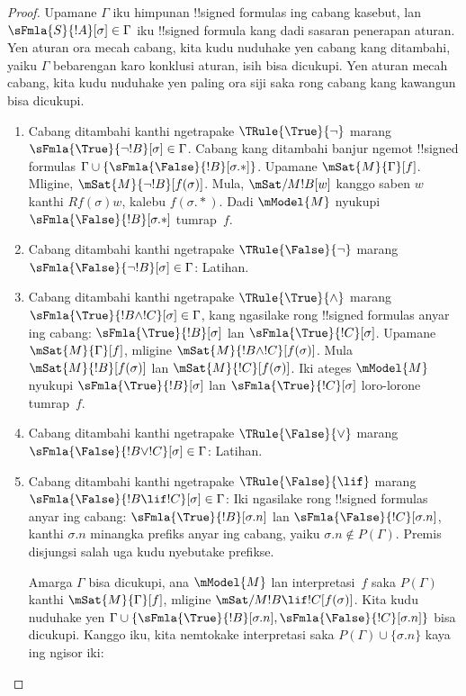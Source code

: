 \documentclass[../../../include/open-logic-section]{subfiles}
\begin{document}
\begin{proof}
Upamane $\Gamma$ iku himpunan !!{signed formula}s ing cabang kasebut,
lan $\sFmla{S}{!A}[\sigma] \in \Gamma$ iku !!{signed formula} kang
dadi sasaran penerapan aturan. Yen aturan ora mecah cabang, kita
kudu nuduhake yen cabang kang ditambahi, yaiku $\Gamma$ bebarengan
karo konklusi aturan, isih bisa dicukupi. Yen aturan mecah cabang,
kita kudu nuduhake yen paling ora siji saka rong cabang kang
kawangun bisa dicukupi.
\begin{enumerate}
\item Cabang ditambahi kanthi ngetrapake $\TRule{\True}{\lnot}$ marang
  $\sFmla{\True}{\lnot !B}[\sigma] \in \Gamma$. Cabang kang ditambahi
  banjur ngemot !!{signed formula}s $\Gamma \cup
  \{\sFmla{\False}{!B}[\sigma.{*}]\}$. Upamane $\mSat{M}{\Gamma}[f]$.
  Mligine, $\mSat{M}{\lnot !B}[f(\sigma)]$. Mula,
  $\mSat/{M}{!B}[w]$ kanggo saben $w$ kanthi $Rf(\sigma)w$, kalebu
  $f(\sigma.{*})$. Dadi $\mModel{M}$ nyukupi
  $\sFmla{\False}{!B}[\sigma.{*}]$ tumrap~$f$.
\item Cabang ditambahi kanthi ngetrapake $\TRule{\False}{\lnot}$ marang
  $\sFmla{\False}{\lnot !B}[\sigma] \in \Gamma$: Latihan.
\item Cabang ditambahi kanthi ngetrapake $\TRule{\True}{\land}$ marang
  $\sFmla{\True}{!B \land !C}[\sigma] \in \Gamma$, kang ngasilake
  rong !!{signed formula}s anyar ing cabang:
  $\sFmla{\True}{!B}[\sigma]$ lan $\sFmla{\True}{!C}[\sigma]$.
  Upamane $\mSat{M}{\Gamma}[f]$, mligine $\mSat{M}{!B \land
    !C}[f(\sigma)]$. Mula $\mSat{M}{!B}[f(\sigma)]$ lan
  $\mSat{M}{!C}[f(\sigma)]$. Iki ateges $\mModel{M}$ nyukupi
  $\sFmla{\True}{!B}[\sigma]$ lan $\sFmla{\True}{!C}[\sigma]$
  loro-lorone tumrap~$f$.
\item Cabang ditambahi kanthi ngetrapake $\TRule{\False}{\lor}$ marang
  $\sFmla{\False}{!B \lor !C}[\sigma] \in \Gamma$: Latihan.
\item Cabang ditambahi kanthi ngetrapake $\TRule{\False}{\lif}$ marang
  $\sFmla{\False}{!B \lif !C}[\sigma] \in \Gamma$: Iki ngasilake rong
  !!{signed formula}s anyar ing cabang: $\sFmla{\True}{!B}[\sigma.n]$ lan
  $\sFmla{\False}{!C}[\sigma.n]$, kanthi $\sigma.n$ minangka prefiks
  anyar ing cabang, yaiku $\sigma.n \notin P(\Gamma)$.
Premis disjungsi salah uga kudu nyebutake prefikse.
  
  Amarga $\Gamma$ bisa dicukupi, ana $\mModel{M}$ lan interpretasi~$f$
  saka $P(\Gamma)$ kanthi $\mSat{M}{\Gamma}[f]$, mligine
  $\mSat/{M}{!B \lif !C}[f(\sigma)]$. Kita kudu nuduhake yen
  $\Gamma \cup \{\sFmla{\True}{!B}[\sigma.n], \sFmla{\False}{!C}[\sigma.n]\}$
  bisa dicukupi. Kanggo iku, kita nemtokake interpretasi saka
  $P(\Gamma) \cup \{\sigma.n\}$ kaya ing ngisor iki:
  

\end{enumerate}
\end{proof}
\end{document}
